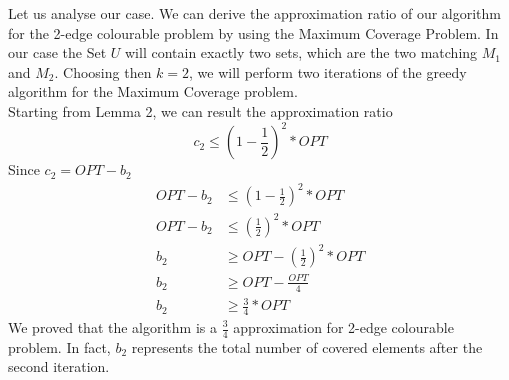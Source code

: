 \documentclass[a4paper,11pt]{article}
\begin{document}
Let us analyse our case. We can derive the approximation ratio of our algorithm for the 2-edge colourable problem by using the Maximum Coverage Problem. In our case the Set $U$ will contain exactly two sets, which are the two matching $M_1$ and $M_2$. Choosing then $k=2$, we will perform two iterations of the greedy algorithm for the Maximum Coverage problem. \\
Starting from Lemma 2, we can result the approximation ratio
$$c_{2} \leq ( 1- \frac{1}{2})^{2} * OPT$$
Since $c_2 = OPT - b_2$
\begin{align*}
	OPT- b_{2} &\leq ( 1- \frac{1}{2})^{2} * OPT\\
	OPT- b_{2} &\leq (\frac{1}{2})^{2} * OPT\\
	b_{2} &\geq OPT - (\frac{1}{2})^{2} * OPT\\
	b_{2} &\geq OPT - \frac {OPT}{4}\\
	b_{2} &\geq \frac {3}{4} *OPT
\end{align*}
We proved that the algorithm is a $\frac {3}{4}$ approximation for 2-edge colourable problem. In fact, $b_2$ represents the total number of covered elements after the second iteration.
\end{document}
